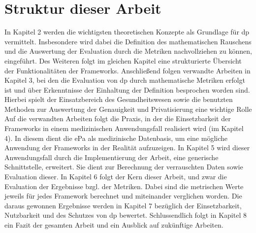 \section{Struktur dieser Arbeit}
In Kapitel 2 werden die wichtigsten theoretischen Konzepte als Grundlage für \gls{dp} vermittelt. Insbesondere wird dabei die Definition des mathematischen Rauschens und die Auswertung der Evaluation durch die Metriken nachvollziehen zu können, eingeführt. Des Weiteren folgt im gleichen Kapitel eine strukturierte Übersicht der Funktionalitäten der Frameworks.
Anschließend folgen verwandte Arbeiten in Kapitel 3, bei den die Evaluation von \gls{dp} durch mathematische Metriken erfolgt ist und über Erkenntnisse der Einhaltung der Definition besprochen worden sind. Hierbei spielt der Einsatzbereich des Gesundheitswesen sowie die benutzten Methoden zur Auswertung der Genauigkeit und Privatisierung eine wichtige Rolle
Auf die verwandten Arbeiten folgt die Praxis, in der die Einsetzbarkeit der Frameworks in einem medizinischen Anwendungsfall realisiert wird (im Kapitel 4). In diesem dient die \gls{ePa} als medizinische Datenbasis, um eine mögliche Anwendung der Frameworks in der Realität aufzuzeigen. In Kapitel 5 wird dieser Anwendungsfall durch die Implementierung der Arbeit, eine generische Schnittstelle, erweitert. Sie dient zur Berechnung der verrauschten Daten sowie Evaluation dieser.
In Kapitel 6 folgt der Kern dieser Arbeit, und zwar die Evaluation der Ergebnisse bzgl. der Metriken. Dabei sind die metrischen Werte jeweils für jedes Framework berechnet und miteinander verglichen worden.
Die daraus gewonnen Ergebnisse werden in Kapitel 7 bezüglich der Einsetzbarkeit, Nutzbarkeit und des Schutzes von \gls{dp} bewertet. Schlussendlich folgt in Kapitel 8 ein Fazit der gesamten Arbeit und ein Ausblick auf zukünftige Arbeiten.
